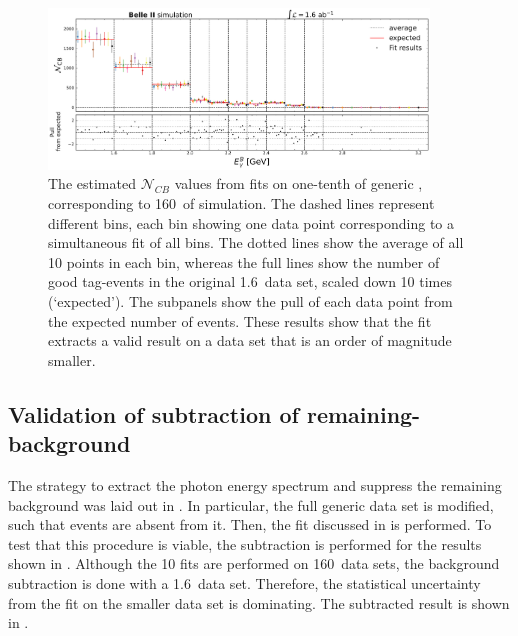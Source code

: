 \begin{figure}[htbp!]
    \includegraphics[width=0.9\textwidth]{figures/mc_validation/extracted_signal_generic_mc.pdf}
    \caption{\label{fig:extracted_validation_mc}The estimated $\mathcal{N}_{CB}$ values from fits on one-tenth of generic \MC, corresponding to 160~\invfb of simulation.
    The dashed lines represent different \EB bins, each bin showing one data point corresponding to a simultaneous fit of all \EB bins.
    The dotted lines show the average of all 10 points in each bin, whereas the full lines show the number of good tag-\B events in the original 1.6~\invab data set, scaled down 10 times (`expected').
    The subpanels show the pull of each data point from the expected number of events.
    These results show that the fit extracts a valid result on a data set that is an order of magnitude smaller.
    }
\end{figure}

\subsection{Validation of subtraction of remaining-\texorpdfstring{\BB}{BB} background}\label{sec:background_subtraction_validation_mc}

The strategy to extract the \BtoXsgamma photon energy spectrum and suppress the remaining \BB background was laid out in .
In particular, the full generic \MC data set is modified, such that \BtoXsgamma events are absent from it.
Then, the \Mbc fit discussed in  is performed.
To test that this procedure is viable, the subtraction is performed for the results shown in .
Although the 10 fits are performed on 160~\invfb data sets, the background subtraction is done with a 1.6~\invab data set.
Therefore, the statistical uncertainty from the fit on the smaller data set is dominating.
The subtracted result is shown in .

